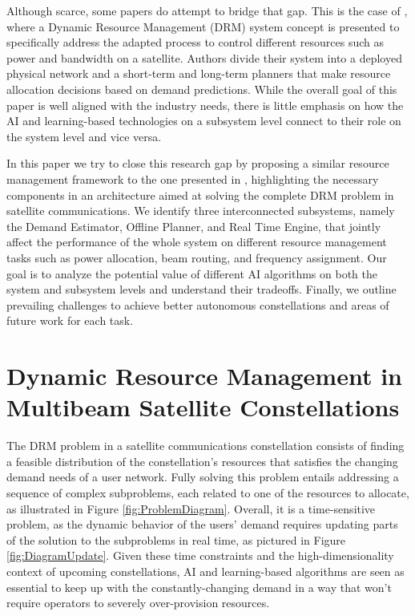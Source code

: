 \documentclass[letterpaper]{article} %
\begin{document}
Although scarce, some papers do attempt to bridge that gap. This is the case of \cite{Guerster2019}, where a Dynamic Resource Management (DRM) system concept is presented to specifically address the adapted process to control different resources such as power and bandwidth on a satellite. Authors divide their system into a deployed physical network and a short-term and long-term planners that make resource allocation decisions based on demand predictions. While the overall goal of this paper is well aligned with the industry needs, there is little emphasis on how the AI and learning-based technologies on a subsystem level connect to their role on the system level and vice versa.

In this paper we try to close this research gap by proposing a similar resource management framework to the one presented in \cite{Guerster2019}, highlighting the necessary components in an architecture aimed at solving the complete DRM problem in satellite communications. We identify three interconnected subsystems, namely the Demand Estimator, Offline Planner, and Real Time Engine, that jointly affect the performance of the whole system on different resource management tasks such as power allocation, beam routing, and frequency assignment. Our goal is to analyze the potential value of different AI algorithms on both the system and subsystem levels and understand their tradeoffs. Finally, we outline prevailing challenges to achieve better autonomous constellations and areas of future work for each task.






\section{Dynamic Resource Management in Multibeam Satellite Constellations}
\label{sec:2}


The DRM problem in a satellite communications constellation consists of finding a feasible distribution of the constellation's resources that satisfies the changing demand needs of a user network. Fully solving this problem entails addressing a sequence of complex subproblems, each related to one of the resources to allocate, as illustrated in Figure \ref{fig:ProblemDiagram}. Overall, it is a time-sensitive problem, as the dynamic behavior of the users' demand requires updating parts of the solution to the subproblems in real time, as pictured in Figure \ref{fig:DiagramUpdate}. Given these time constraints and the high-dimensionality context of upcoming constellations, AI and learning-based algorithms are seen as essential to keep up with the constantly-changing demand in a way that won't require operators to severely over-provision resources.
\end{document}
